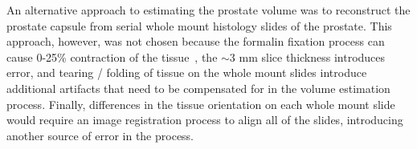 An alternative approach to estimating the prostate volume was to reconstruct
the prostate capsule from serial whole mount histology slides of the prostate.
This approach, however, was not chosen because the formalin fixation process
can cause 0-25\% contraction of the tissue~\cite{Schned1996}, the $\sim$3 mm
slice thickness introduces error, and tearing / folding of tissue on the whole
mount slides introduce additional artifacts that need to be compensated for in
the volume estimation process.  Finally, differences in the tissue orientation
on each whole mount slide would require an image registration process to align
all of the slides, introducing another source of error in the process.
